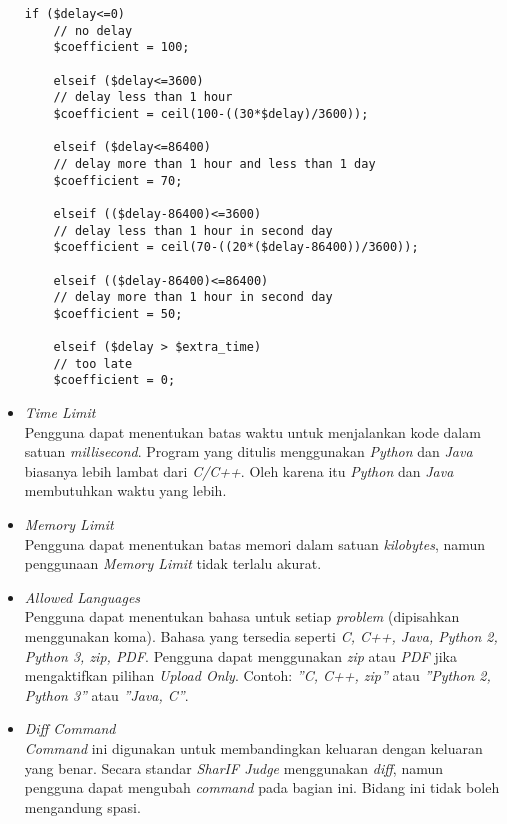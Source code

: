\begin{itemize}
	\begin{lstlisting}[basicstyle=\ttfamily, frame=single,
	columns=fullflexible, keepspaces=true, breaklines=true, label=ls:7]
	if ($delay<=0)
	// no delay
	$coefficient = 100;
	
	elseif ($delay<=3600)
	// delay less than 1 hour
	$coefficient = ceil(100-((30*$delay)/3600));
	
	elseif ($delay<=86400)
	// delay more than 1 hour and less than 1 day
	$coefficient = 70;
	
	elseif (($delay-86400)<=3600)
	// delay less than 1 hour in second day
	$coefficient = ceil(70-((20*($delay-86400))/3600));
	
	elseif (($delay-86400)<=86400)
	// delay more than 1 hour in second day
	$coefficient = 50;
	
	elseif ($delay > $extra_time)
	// too late
	$coefficient = 0;
	\end{lstlisting}
	
	\item \textit{Time Limit} \\
	Pengguna dapat menentukan batas waktu untuk menjalankan kode dalam satuan \textit{millisecond}. Program yang ditulis menggunakan \textit{Python} dan \textit{Java} biasanya lebih lambat dari \textit{C/C++}. Oleh karena itu \textit{Python} dan \textit{Java} membutuhkan waktu yang lebih.
	
	\item \textit{Memory Limit} \\
	Pengguna dapat menentukan batas memori dalam satuan \textit{kilobytes}, namun penggunaan \textit{Memory Limit} tidak terlalu akurat.
	
	\item \textit{Allowed Languages} \\
	Pengguna dapat menentukan bahasa untuk setiap \textit{problem} (dipisahkan menggunakan koma). Bahasa yang tersedia seperti \textit{C, C++, Java, Python 2, Python 3, zip, PDF}. Pengguna dapat menggunakan \textit{zip} atau \textit{PDF} jika mengaktifkan pilihan \textit{Upload Only}. Contoh: \textit{''C, C++, zip''} atau \textit{''Python 2, Python 3''} atau \textit{''Java, C''}.
	
	\item \textit{Diff Command} \\
	\textit{Command} ini digunakan untuk membandingkan keluaran dengan keluaran yang benar. Secara standar \textit{SharIF Judge} menggunakan \textit{diff}, namun pengguna dapat mengubah \textit{command} pada bagian ini. Bidang ini tidak boleh mengandung spasi.
	

\end{itemize}
